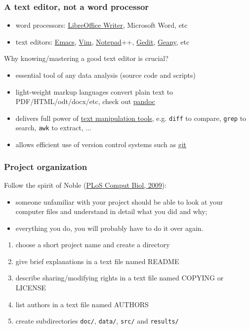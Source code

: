 \documentclass[c]{beamer} %
\begin{document}
\begin{frame}[fragile]
  \frametitle{A text editor, not a word processor}
  \begin{itemize}
  \item word processors: \href{https://www.libreoffice.org/discover/writer/}{LibreOffice Writer}, Microsoft Word, etc
  \item text editors: \href{https://www.gnu.org/software/emacs/}{Emacs}, \href{https://www.vim.org/}{Vim}, \href{https://notepad-plus-plus.org/}{Notepad}++, \href{https://wiki.gnome.org/Apps/Gedit}{Gedit}, \href{http://www.geany.org/}{Geany}, etc
  \end{itemize}
  
  \bigskip
  \pause
  
  Why \alert{knowing/mastering a good text editor is crucial}?
  \begin{itemize}
  \item essential tool of any data analysis (source code and scripts)
  \item light-weight markup languages convert plain text to PDF/HTML/odt/docx/etc, check out \href{http://pandoc.org/}{pandoc}
  \item delivers full power of \href{http://www.ibm.com/developerworks/aix/library/au-unixtext/index.html}{text manipulation tools}, e.g. \verb+diff+ to compare, \verb+grep+ to search, \verb+awk+ to extract, ...
  \item allows efficient use of version control systems such as \href{http://www.git-scm.com/}{git}
  \end{itemize}
\end{frame}

\begin{frame}[fragile]
  \frametitle{Project organization}
  Follow the spirit of Noble (\href{http://dx.doi.org/10.1371/journal.pcbi.1000424}{PLoS Comput Biol, 2009}):
  \begin{itemize}
  \item someone unfamiliar with your project should be able to look at your computer files and understand in detail what you did and why;
  \item everything you do, you will probably have to do it over again.
  \end{itemize}
  
  \bigskip
  \pause
  
  \begin{enumerate}
  \item choose a short project name and create a directory
  \item give brief explanations in a text file named README
  \item describe sharing/modifying rights in a text file named COPYING or LICENSE
  \item list authors in a text file named AUTHORS
  \item create subdirectories \verb+doc/+, \verb+data/+, \verb+src/+ and \verb+results/+
  \end{enumerate}
\end{frame}
\end{document}
